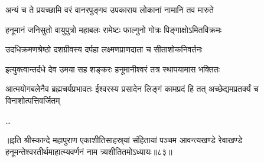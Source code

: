 \twolineshloka
{अन्यं च ते प्रयच्छामि वरं वानरपुङ्गव}
{उपकाराय लोकानां नामानि तव मारुते}%

\twolineshloka
{हनूमानं जनिसुतो वायुपुत्रो महाबलः}
{रामेष्टः फाल्गुनो गोत्रः पिङ्गाक्षोऽमितविक्रमः}%

\twolineshloka
{उदधिक्रमणश्रेष्ठो दशग्रीवस्य दर्पहा}
{लक्ष्मणप्राणदाता च सीताशोकनिवर्तनः}%

\twolineshloka
{इत्युक्त्वान्तर्दधे देव उमया सह शङ्करः}
{हनूमानीश्वरं तत्र स्थापयामास भक्तितः}%

\threelineshloka
{आत्मयोगबलेनैव ब्रह्मचर्यप्रभावतः}
{ईश्वरस्य प्रसादेन लिङ्गं कामप्रदं हि तत्}
{अच्छेद्यमप्रतर्क्यं च विनाशोत्पत्तिवर्जितम्}%

\ldots

॥इति श्रीस्कान्दे महापुराण एकाशीतिसाहस्र्यां संहितायां पञ्चम आवन्त्यखण्डे रेवाखण्डे हनूमन्तेश्वरतीर्थमाहात्म्यवर्णनं नाम त्र्यशीतितमोऽध्यायः॥८३॥